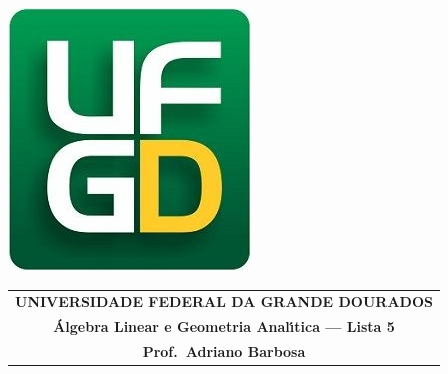 \documentclass[a4paper,5pt]{amsbook}
\begin{document}
\thispagestyle{empty}
\pagestyle{empty}
\begin{minipage}[h]{0.14\textwidth}
	\includegraphics[scale=0.24]{../../ufgd.png}
\end{minipage}
\begin{minipage}[h]{\textwidth}
\begin{tabular}{c}
{{\bf UNIVERSIDADE FEDERAL DA GRANDE DOURADOS}}\\
{{\bf \'{A}lgebra Linear e Geometria Anal\'{\i}tica --- Lista 5}}\\
{{\bf Prof.\ Adriano Barbosa}}\\
\end{tabular}
\vspace{-0.45cm}
%
\end{minipage}

\end{document}
